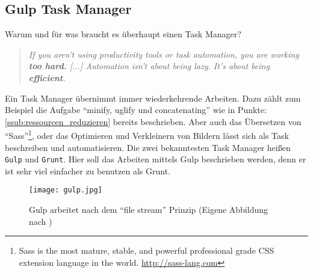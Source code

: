 	\subsection{Gulp Task Manager} %
	\label{sub:gulp_task_manager}
		Warum und für was braucht es überhaupt einen Task Manager?
		\begin{quote}
			\textit{If you aren't using productivity tools or task automation, you are working \textbf{too hard.} [...] Automation isn't about being lazy. It's about being \textbf{efficient}.}\autocite[p. 18,78]{addyOsmani14}
		\end{quote}
		Ein Task Manager übernimmt immer wiederkehrende Arbeiten. Dazu zählt zum Beispiel die Aufgabe "`minify, uglify und concatenating"' wie in Punkte: \ref{ssub:ressourcen_reduzieren} bereits beschrieben. Aber auch das Übersetzen von "`Sass"'\footnote{Sass is the most mature, stable, and powerful professional grade CSS extension language in the world. \url{http://sass-lang.com}}, oder das Optimieren und Verkleinern von Bildern lässt sich als Task beschreiben und automatisieren.
		Die zwei bekanntesten Task Manager heißen \texttt{Gulp} und \texttt{Grunt}. Hier soll das Arbeiten mittels Gulp beschrieben werden, denn er ist sehr viel einfacher zu benutzen als Grunt.

		\begin{figure}[htbp]
			\begin{center}
				\texttt{[image: gulp.jpg]}
				\caption{Gulp arbeitet nach dem "`file stream"' Prinzip (Eigene Abbildung nach \autocite[p. 85]{addyOsmani14})}
				\label{fig:gulp}
			\end{center}
		\end{figure}

